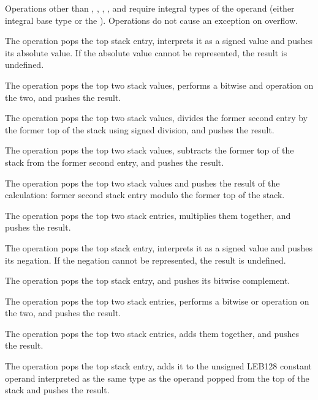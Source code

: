 Operations other than \DWOPabs{},
\DWOPdiv{}, \DWOPminus{}, \DWOPmul{}, \DWOPneg{} and \DWOPplus{}
require integral types of the operand (either integral base type
or the \generictype).  Operations do not cause an exception
on overflow.

\begin{enumerate}[1. ]
\itembfnl{\DWOPabsTARG}
The \DWOPabsNAME{} operation pops the top stack entry, interprets
it as a signed value and pushes its absolute value. If the
absolute value cannot be represented, the result is undefined.

\itembfnl{\DWOPandTARG}
The \DWOPandNAME{} operation pops the top two stack values, performs
a bitwise and operation on the two, and pushes the result.

\itembfnl{\DWOPdivTARG}
The \DWOPdivNAME{} operation pops the top two stack values, divides the former second entry by
the former top of the stack using signed division, and pushes the result.

\itembfnl{\DWOPminusTARG}
The \DWOPminusNAME{} operation pops the top two stack values, subtracts the former top of the
stack from the former second entry, and pushes the result.

\itembfnl{\DWOPmodTARG}
The \DWOPmodNAME{} operation pops the top two stack values and pushes the result of the
calculation: former second stack entry modulo the former top of the stack.

\itembfnl{\DWOPmulTARG}
The \DWOPmulNAME{} operation pops the top two stack entries, multiplies them together, and
pushes the result.

\itembfnl{\DWOPnegTARG}
The \DWOPnegNAME{} operation pops the top stack entry, interprets
it as a signed value and pushes its negation. If the negation
cannot be represented, the result is undefined.

\itembfnl{\DWOPnotTARG}
The \DWOPnotNAME{} operation pops the top stack entry, and pushes
its bitwise complement.

\itembfnl{\DWOPorTARG}
The \DWOPorNAME{} operation pops the top two stack entries, performs
a bitwise or operation on the two, and pushes the result.

\itembfnl{\DWOPplusTARG}
The \DWOPplusNAME{} operation pops the top two stack entries,
adds them together, and pushes the result.

\itembfnl{\DWOPplusuconstTARG}
The \DWOPplusuconstNAME{} operation pops the top stack entry,
adds it to the unsigned LEB128
constant operand
interpreted as the same type as the operand popped from the
top of the stack and pushes the result.


\end{enumerate}
